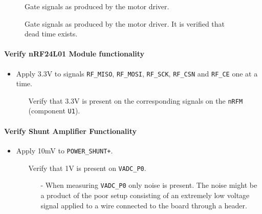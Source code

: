 \begin{figure}[h]
	\centering
	\caption{Gate signals as produced by the motor driver.}
	\label{fig:controllerboardv2_gate_b}
\end{figure}

\begin{figure}[h]
	\centering
	\caption[Dead time on gate signals.]{Gate signals as produced by the motor driver. It is verified that dead time exists.}
	\label{fig:controllerboardv2_gate_b_deadtime}
\end{figure}

\paragraph{Verify nRF24L01 Module functionality} %
\label{par:verify_nrf24l01_module_functionality}
\begin{itemize}
	\item Apply 3.3V to signals \texttt{RF\_MISO}, \texttt{RF\_MOSI}, \texttt{RF\_SCK}, \texttt{RF\_CSN} and \texttt{RF\_CE} one at a time.
	\begin{itemize}
		\item[\cmark] Verify that 3.3V is present on the corresponding signals on the \texttt{nRFM} (component \texttt{U1}).
	\end{itemize}
\end{itemize}

\paragraph{Verify Shunt Amplifier Functionality} %
\label{par:verify_shunt_amplifier_functionality}
\begin{itemize}
	\item Apply 10mV to \texttt{POWER\_SHUNT+}.
	\begin{itemize}
		\item[\xmark] Verify that 1V is present on \texttt{VADC\_P0}.
		\begin{itemize}
			\item[-] When measuring \texttt{VADC\_P0} only noise is present. 
			The noise might be a product of the poor setup consisting of an extremely low voltage signal applied to a wire connected to the board through a header. 
		\end{itemize}
	\end{itemize}
\end{itemize}


